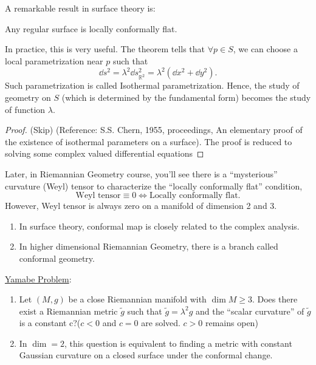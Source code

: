 A remarkable result in surface theory is: 
\begin{theorem}
    Any regular surface is locally conformally flat.
\end{theorem}
In practice, this is very useful. The theorem tells that 
\(\forall p \in S\), we can choose a local parametrization
near \(p\) such that 
\[
    \dd s^2=\lambda^2\dd s_{\mathbb{R}^2}^2=\lambda^2\left(
        \dd x^2+\dd y^2
    \right).
\]
Such parametrization is called Isothermal parametrization.
Hence, the study of geometry on \(S\) (which is determined by the
 fundamental form) becomes the study of function
\(\lambda\).
\begin{proof}
    (Skip) (Reference: S.S. Chern, 1955, proceedings, An elementary 
    proof of the existence of isothermal parameters on a surface). 
    The proof is reduced to solving some complex valued differential
    equations
\end{proof}
\begin{remark}
    Later, in Riemannian Geometry course, you'll see there is a
    ``mysterious'' curvature  (Weyl) tensor to characterize the 
    ``locally conformally flat'' condition, \ie\ 
    \[\text{Weyl tensor}\equiv 0\Leftrightarrow \text{Locally 
    conformally flat}.\]
    However, Weyl tensor is always zero on a manifold of dimension
    2 and 3.
\end{remark}
\begin{remark}
    \begin{enumerate}[(1)]
        \item In surface theory, conformal map is closely related to
         the complex analysis.
        \item In higher dimensional Riemannian Geometry, there is a
        branch called conformal geometry.
    \end{enumerate}
\end{remark}

\underline{Yamabe Problem}:
\begin{enumerate}[(1)]
    \item Let \((M,g)\) be a close Riemannian manifold with 
    \(\dim M\ge 3\). Does there exist a Riemannian metric
    \(\tilde{g}\) such that \(\tilde{g}=\lambda^2 g\) and the 
    ``scalar curvature'' of \(\tilde{g}\) is a constant c?(\(c<0\)
    and \(c=0\) are solved. \(c>0\) remains open)
    \item In \(\dim =2\), this question is equivalent to 
    finding a metric with constant Gaussian curvature on a closed
    surface under the conformal change.
\end{enumerate}
